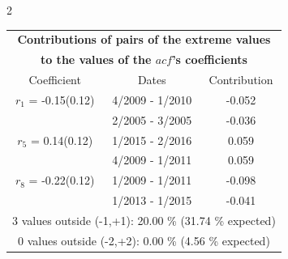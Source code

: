 
\thispagestyle{empty}
\begin{multicols}{2}{ 
\begin{tabular}{ccc}
\multicolumn{3}{c}{\textbf{Contributions of pairs of the extreme values} }  \vspace{-.10in}  \\ 
\multicolumn{3}{c}{ \textbf{to the values of the $acf$'s coefficients}} \\ 
\hline 
\hline                  Coefficient  &  Dates &  Contribution \\ 
\hline 
  $r_{ 1}$ = -0.15(0.12) &       4/2009 -  1/2010 &       -0.052    \vspace{-.10in} \\ 
  &        2/2005 -  3/2005 &       -0.036  \vspace{-.02in}   \\ \hline 
    $r_{ 5}$ = 0.14(0.12) &       1/2015 -  2/2016 &        0.059   \vspace{-.10in} \\  
&        4/2009 -  1/2011 &        0.059  \vspace{-.02in} \\ \hline 
  $r_{ 8}$ = -0.22(0.12) &       1/2009 -  1/2011 &       -0.098    \vspace{-.10in} \\ 
  &        1/2013 -  1/2015 &       -0.041  \vspace{-.02in}   \\ \hline 
  \multicolumn{3}{c}{               3 values outside (-1,+1): 20.00  \% (31.74  \% expected)}\vspace{-.10in} \\ 
\multicolumn{3}{c}{               0 values outside (-2,+2):  0.00 \%  (4.56 \% expected) } \\
 \end{tabular} \\ 
 } 
\end{multicols} 
